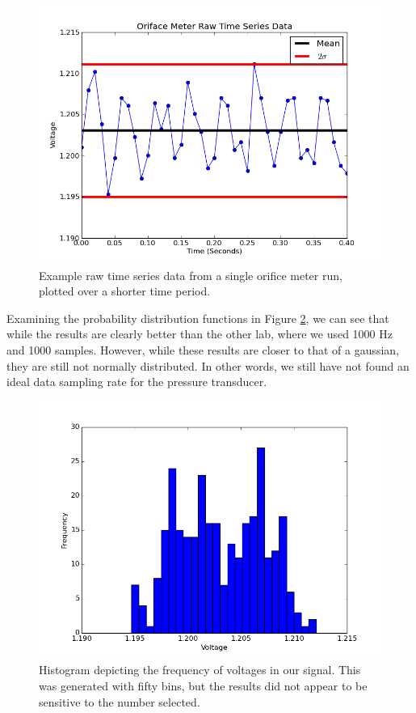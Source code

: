 \documentclass{article}
\begin{document}
\begin{figure}[!htb]
  \begin{center}
    \includegraphics[width = 12 cm]{figs/oriface_time_04.png}
    \caption{Example raw time series data from a single orifice meter 
      run, plotted over a shorter time period.}
    \label{oriface-time-4}
  \end{center}
\end{figure}


Examining the probability distribution functions in Figure \ref{oriface-hist},
we can see that while the results are clearly better than the other lab, where we used 1000 Hz and 1000 samples. 
However, while these results are closer to that of a gaussian, 
they are still not normally distributed. In other words, we still have not found an ideal data sampling rate 
for the pressure transducer.  

  \begin{figure}[!htb]
   \begin{center}
    \includegraphics[width = 12 cm]{figs/oriface_hist.png}
    \caption{Histogram depicting the frequency of voltages in our
    signal. This was generated with fifty bins, but the results did not
    appear to be sensitive to the number selected.}
    \label{oriface-hist}
   \end{center}
  \end{figure}
\end{document}
